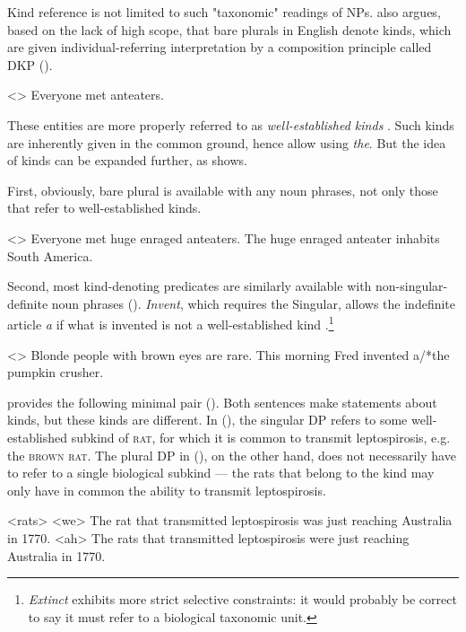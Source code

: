 \documentclass[a4paper, 12pt]{article}
\begin{document}
Kind reference is not limited to such "taxonomic" readings of NPs. \textcite{chierchia1998referencekindslanguages} also argues, based on the lack of high scope, that bare plurals in English denote kinds, which are given individual-referring interpretation by a composition principle called DKP (\nextx).

\ex<>
    Everyone met anteaters.
\xe

These entities are more properly referred to as \emph{well-established kinds} \parencite{krifka1995genericityintroduction}. Such kinds are inherently given in the common ground, hence allow using \textit{the}. But the idea of kinds can be expanded further, as \textcite{mendia2019referenceadhoc} shows. 

First, obviously, bare plural is available with any noun phrases, not only those that refer to well-established kinds.

\pex<>
    \a Everyone met huge enraged anteaters.
    \a \ljudge*The huge enraged anteater inhabits South America.
\xe

Second, most kind-denoting predicates are similarly available with non-singular-definite noun phrases (\nextx). \textit{Invent}, which requires the Singular, allows the indefinite article \textit{a} if what is invented is not a well-established kind \parencite{dayal2004numbermarkingdefiniteness}.\footnote{\textit{Extinct} exhibits more strict selective constraints: it would probably be correct to say it must refer to a biological taxonomic unit.}

\pex<>
    \a Blonde people with brown eyes are rare.
    \a This morning Fred invented a/*the pumpkin crusher.
\xe


\textcite{mendia2019referenceadhoc} provides the following minimal pair (\nextx). Both sentences make statements about kinds, but these kinds are different. In (), the singular DP refers to some well-established subkind of \textsc{rat}, for which it is common to transmit leptospirosis, e.g. the \textsc{brown rat}. The plural DP in (), on the other hand, does not necessarily have to refer to a single biological subkind --- the rats that belong to the kind may only have in common the ability to transmit leptospirosis.

\pex<rats>
    \a<we> The rat that transmitted leptospirosis was just reaching Australia in 1770.  
    \a<ah> The rats that transmitted leptospirosis were just reaching Australia in 1770.
\xe
        
\end{document}
